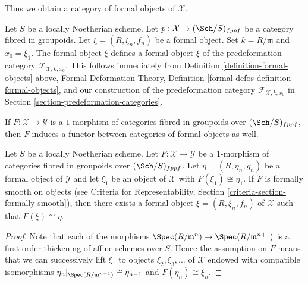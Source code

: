 \noindent
Thus we obtain a category of formal objects of $\mathcal{X}$.

\begin{remark}
\label{remark-formal-objects-match}
Let $S$ be a locally Noetherian scheme. Let
$p : \mathcal{X} \to (\Sch/S)_{fppf}$ be a category fibred in groupoids.
Let $\xi = (R, \xi_n, f_n)$ be a formal object. Set $k = R/\mathfrak m$ and
$x_0 = \xi_1$. The formal object $\xi$ defines a formal object
$\xi$ of the predeformation category $\mathcal{F}_{\mathcal{X}, k, x_0}$.
This follows immediately from
Definition \ref{definition-formal-objects} above,
Formal Deformation Theory, Definition
\ref{formal-defos-definition-formal-objects},
and our construction of the predeformation category
$\mathcal{F}_{\mathcal{X}, k, x_0}$ in
Section \ref{section-predeformation-categories}.
\end{remark}

\noindent
If $F : \mathcal{X} \to \mathcal{Y}$ is a $1$-morphism of categories fibred
in groupoids over $(\Sch/S)_{fppf}$, then $F$ induces a functor between
categories of formal objects as well.

\begin{lemma}
\label{lemma-smooth-lift-formal}
Let $S$ be a locally Noetherian scheme. Let $F : \mathcal{X} \to \mathcal{Y}$
be a $1$-morphism of categories fibred in groupoids over $(\Sch/S)_{fppf}$.
Let $\eta = (R, \eta_n, g_n)$ be a formal object of $\mathcal{Y}$
and let $\xi_1$ be an object of $\mathcal{X}$ with $F(\xi_1) \cong \eta_1$.
If $F$ is formally smooth on objects (see
Criteria for Representability, Section \ref{criteria-section-formally-smooth}),
then there exists a formal object $\xi = (R, \xi_n, f_n)$ of $\mathcal{X}$
such that $F(\xi) \cong \eta$.
\end{lemma}

\begin{proof}
Note that each of the morphisms
$\Spec(R/\mathfrak m^n) \to \Spec(R/\mathfrak m^{n + 1})$ is a first order
thickening of affine schemes over $S$. Hence the assumption on $F$ means
that we can successively lift $\xi_1$ to objects $\xi_2, \xi_3, \ldots$
of $\mathcal{X}$ endowed with compatible isomorphisms
$\eta_n|_{\Spec(R/\mathfrak m^{n - 1})} \cong \eta_{n - 1}$
and $F(\eta_n) \cong \xi_n$.
\end{proof}


